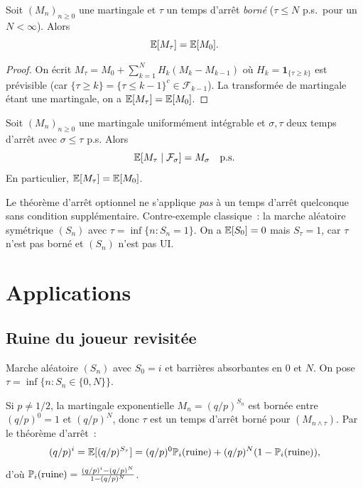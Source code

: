 \begin{theoreme}
\label{thm:arret_borne}
Soit $(M_n)_{n \geq 0}$ une martingale et $\tau$ un temps d'arr\^et \emph{born\'e}
($\tau \leq N$ p.s.\ pour un $N < \infty$). Alors
\[
  \mathbb{E}[M_{\tau}] = \mathbb{E}[M_0].
\]
\end{theoreme}

\begin{proof}
On \'ecrit $M_{\tau} = M_0 + \sum_{k=1}^N H_k (M_k - M_{k-1})$ o\`u
$H_k = \mathbf{1}_{\{\tau \geq k\}}$ est pr\'evisible (car $\{\tau \geq k\} = \{\tau \leq k-1\}^c
\in \mathcal{F}_{k-1}$). La transform\'ee de martingale \'etant une martingale, on a
$\mathbb{E}[M_{\tau}] = \mathbb{E}[M_0]$.
\end{proof}

\begin{theoreme}
\label{thm:arret_general}
Soit $(M_n)_{n \geq 0}$ une martingale uniform\'ement int\'egrable et $\sigma, \tau$
deux temps d'arr\^et avec $\sigma \leq \tau$ p.s. Alors
\[
  \mathbb{E}[M_{\tau} \mid \mathcal{F}_{\sigma}] = M_{\sigma} \quad \text{p.s.}
\]
En particulier, $\mathbb{E}[M_{\tau}] = \mathbb{E}[M_0]$.
\end{theoreme}

\begin{attention}[title=\textbf{Conditions du th\'eor\`eme d'arr\^et}]
Le th\'eor\`eme d'arr\^et optionnel ne s'applique \emph{pas} \`a un temps d'arr\^et
quelconque sans condition suppl\'ementaire. Contre-exemple classique~: la marche
al\'eatoire sym\'etrique $(S_n)$ avec $\tau = \inf\{n : S_n = 1\}$. On a
$\mathbb{E}[S_0] = 0$ mais $S_{\tau} = 1$, car $\tau$ n'est pas born\'e et $(S_n)$ n'est
pas UI.
\end{attention}

\section{Applications}

\subsection{Ruine du joueur revisit\'ee}

\begin{exemple}
Marche al\'eatoire $(S_n)$ avec $S_0 = i$ et barri\`eres absorbantes en $0$ et $N$.
On pose $\tau = \inf\{n : S_n \in \{0, N\}\}$.

Si $p \neq 1/2$, la martingale exponentielle $M_n = (q/p)^{S_n}$ est born\'ee
entre $(q/p)^0 = 1$ et $(q/p)^N$, donc $\tau$ est un temps d'arr\^et born\'e
pour $(M_{n \wedge \tau})$. Par le th\'eor\`eme d'arr\^et~:
\[
  (q/p)^i = \mathbb{E}[(q/p)^{S_\tau}] = (q/p)^0 \mathbb{P}_i(\text{ruine})
  + (q/p)^N (1 - \mathbb{P}_i(\text{ruine})),
\]
d'o\`u $\mathbb{P}_i(\text{ruine}) = \frac{(q/p)^i - (q/p)^N}{1 - (q/p)^N}$.
\end{exemple}

